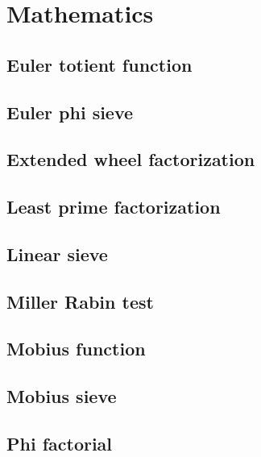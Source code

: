 \section{Mathematics}
\subsection{Euler totient function}
\raggedbottom
\hrulefill
\subsection{Euler phi sieve}
\raggedbottom
\hrulefill
\subsection{Extended wheel factorization}
\raggedbottom
\hrulefill
\subsection{Least prime factorization}
\raggedbottom
\hrulefill
\subsection{Linear sieve}
\raggedbottom
\hrulefill
\subsection{Miller Rabin test}
\raggedbottom
\hrulefill
\subsection{Mobius function}
\raggedbottom
\hrulefill
\subsection{Mobius sieve}
\raggedbottom
\hrulefill
\subsection{Phi factorial}
\raggedbottom
\hrulefill
